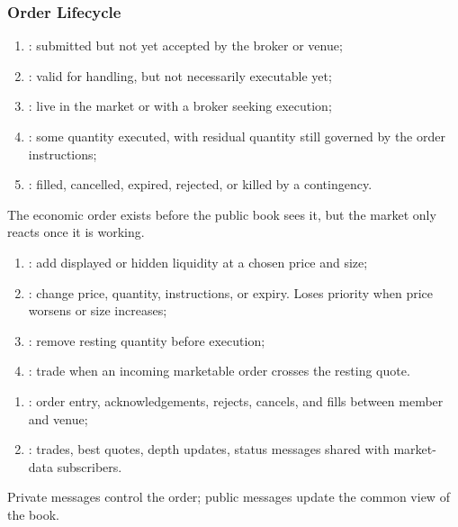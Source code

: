 \subsubsection{Order Lifecycle}

\begin{process} 
\begin{enumerate}[label=\roman*.]
\setlength{\itemsep}{0pt}
\item {}: submitted but not yet accepted by the broker or venue;
\item {}: valid for handling, but not necessarily executable yet;
\item {}: live in the market or with a broker seeking execution;
\item {}: some quantity executed, with residual quantity still governed by the order instructions;
\item {}: filled, cancelled, expired, rejected, or killed by a contingency.
\end{enumerate}
The economic order exists before the public book sees it, but the market only reacts once it is working.
\end{process}

\begin{process} 
\begin{enumerate}[label=\roman*.]
\setlength{\itemsep}{0pt}
\item {}: add displayed or hidden liquidity at a chosen price and size;
\item {}: change price, quantity, instructions, or expiry. Loses priority when price worsens or size increases;
\item {}: remove resting quantity before execution;
\item {}: trade when an incoming marketable order crosses the resting quote.
\end{enumerate}
\end{process}

\begin{taxonomy} 
\begin{enumerate}[label=\roman*.]
\setlength{\itemsep}{0pt}
\item {}: order entry, acknowledgements, rejects, cancels, and fills between member and venue;
\item {}: trades, best quotes, depth updates, status messages shared with market-data subscribers.
\end{enumerate}
Private messages control the order; public messages update the common view of the book.
\end{taxonomy}

